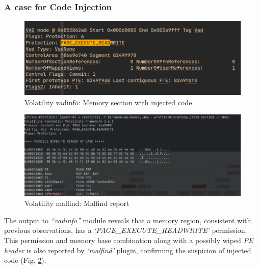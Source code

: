 \documentclass[10pt,a4paper]{article}
\begin{document}
				\subsubsection{A case for Code Injection}
					\begin{figure}[!htbp]%
						\centering
						\includegraphics[width=\columnwidth]{pics/vadinfo.png}
						\caption{Volatility vadinfo: Memory section with injected code}
						\label{vadtree}
					\end{figure}
					\begin{figure}[!htbp]%
						\centering
						\includegraphics[width=\columnwidth]{pics/malfind.png}
						\caption{Volatility malfind: Malfind report}
						\label{malfind}
					\end{figure}
					The output to \textit{``vadinfo''} module reveals that a memory region, consistent with previous observations, has a \textit{`PAGE\_EXECUTE\_READWRITE'} permission.
					This permission and memory base combination along with a possibly wiped \textit{PE header} is also reported by \textit{`malfind'} plugin, confirming the suspicion of injected code (Fig. \ref{malfind}).
\end{document}
